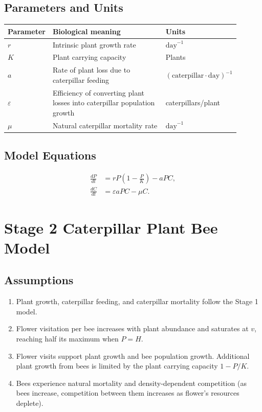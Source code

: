 \documentclass[11pt]{article}
\begin{document}
\subsection{Parameters and Units}
\begin{center}
    \renewcommand{\arraystretch}{1.4}
    \begin{tabular}{@{}p{0.15\linewidth}p{0.49\linewidth}p{0.26\linewidth}@{}}
        \hline
        Parameter & Biological meaning & Units \\
        \hline
        $r$ & Intrinsic plant growth rate & $\mathrm{day}^{-1}$ \\
        $K$ & Plant carrying capacity & Plants \\
        $a$ & Rate of plant loss due to caterpillar
        feeding & $(\mathrm{caterpillar}\cdot\mathrm{day})^{-1}$ \\
        $\varepsilon$ & Efficiency of converting plant losses into caterpillar
        population growth & caterpillars/plant \\
        $\mu$ & Natural caterpillar mortality rate & $\mathrm{day}^{-1}$ \\
        \hline
    \end{tabular}
\end{center}

\subsection{Model Equations}
\begin{equation}
    \begin{aligned}
        \frac{dP}{dt} &= rP\left(1-\frac{P}{K}\right)-aPC, \\
        \frac{dC}{dt} &= \varepsilon aPC-\mu C.
    \end{aligned}
    \label{eq:model}
\end{equation}

\clearpage
\section{Stage 2 Caterpillar Plant Bee Model}

\subsection{Assumptions}
\begin{enumerate}
    \item Plant growth, caterpillar feeding, and caterpillar mortality follow
    the Stage 1 model.
    \item Flower visitation per bee increases with plant abundance and
    saturates at $v$, reaching half its maximum when $P=H$.
    \item Flower visits support plant growth and bee population growth.
    Additional plant growth from bees is limited by the plant carrying capacity $1-P/K$.
    \item Bees experience natural mortality and density-dependent competition (as bees increase, competition between them increases as flower's resources deplete).
\end{enumerate}
\end{document}

